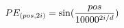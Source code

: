 \documentclass[preview]{standalone}
\begin{document}
\begin{align*}
\special{dvisvgm:raw <g id='unique000'>}PE_{(pos,2i)} = \sin(\frac{pos}{10000^{2i/d}})\special{dvisvgm:raw </g>}
\end{align*}
\end{document}
